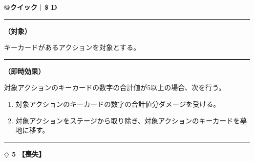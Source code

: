 \documentclass[twocolumn,a5paper,papersize,10pt]{jarticle}
\begin{document}
\begin{tcolorbox}[title={\small\bf【Action】相殺}{\scriptsize （速攻魔法）}]

{\scriptsize\bf @クイック }
  {\scriptsize\bf | \$ D }

\vspace{1mm} %
\hrule height 0.1mm depth 0mm width 62mm %
\vspace{1mm} %

{\bf（対象）}

キーカードがあるアクションを対象とする。

\vspace{1mm} %
\hrule height 0.1mm depth 0mm width 62mm %
\vspace{1mm} %

{\bf（即時効果）}

対象アクションのキーカードの数字の合計値が5以上の場合、次を行う。


\vspace{-1zh}%
\begin{enumerate}
\setlength{\leftskip}{-0.3cm}
\setlength{\parskip}{0pt} %

\item 対象アクションのキーカードの数字の合計値分ダメージを受ける。

\item 対象アクションをステージから取り除き、対象アクションのキーカードを墓地に移す。
\vspace{-1zh}%
\end{enumerate}

\vspace{1mm} %
\end{tcolorbox}

\vspace{-1zh}
  
 

\vspace{3mm} %
\hrule height 0.5mm depth 0mm width 66.5mm %
\vspace{1mm} %
{\Large\bf $\diamondsuit$ 5} {\normalsize\bf【喪失】} %
\vspace{1mm} %
\end{document}
